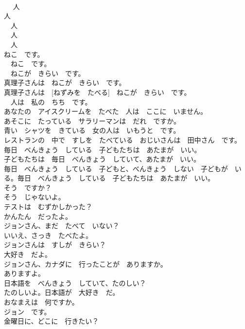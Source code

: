 \documentclass[8pt]{extreport}
\begin{document}
\begin{CJK}{UTF8}{min}
\\	[土曜日に　えいがを　見た]　 人	
\\	人	
\\	[見た]　人	
\\	[えいがを　見た]　人	
\\	[土曜日に　えいがを　見た]　人	
\\	ねこ　です。	
\\	[ねずみを　たべる]　ねこ　です。	
\\	[ねずみを　たべる]　ねこが　きらい　です。	
\\	真理子さんは　ねこが　きらい　です。	
\\	真理子さんは　[ねずみを　たべる]　ねこが　きらい　です。	
\\	[この　本を　かいた]　人は　私の　ちち　です。	
\\	あなたの　アイスクリームを　たべた　人は　ここに　いません。	
\\	あそこに　たっている　サラリーマンは　だれ　ですか。	
\\	青い　シャツを　きている　女の人は　いもうと　です。	
\\	レストランの　中で　すしを　たべている　おじいさんは　田中さん　です。	
\\	毎日　べんきょう　している　子どもたちは　あたまが　いい。	
\\	子どもたちは　毎日　べんきょう　していて、あたまが　いい。	
\\	毎日　べんきょう　している　子どもと、べんきょう　しない　子どもが　いる。毎日　べんきょう　している　子どもたちは　あたまが　いい。	
\\	そう　ですか？	
\\	そう　じゃないよ。	
\\	テストは　むずかしかった？	
\\	かんたん　だったよ。	
\\	ジョンさん、まだ　たべて　いない？	
\\	いいえ、さっき　たべたよ。	
\\	ジョンさんは　すしが　きらい？	
\\	大好き　だよ。	
\\	ジョンさん、カナダに　行ったことが　ありますか。	
\\	ありますよ。	
\\	日本語を　べんきょう　していて、たのしい？	
\\	たのしいよ。日本語が　大好き　だ。	
\\	おなまえは　何ですか。	
\\	ジョン　です。	
\\	金曜日に、どこに　行きたい？	

\end{CJK}
\end{document}
